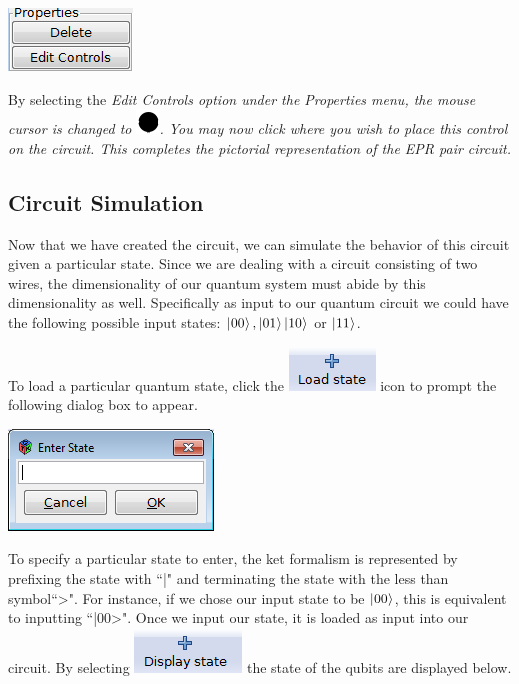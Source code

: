 \documentclass[10pt]{article}
\theoremstyle{definition}
\newcommand{\microspace}{\mspace{0.5mu}}
\def \lket {\left|}
\def \rket {\right\rangle}
\newcommand{\ket}[1]{\lket\microspace #1 \microspace\rket}
\begin{document}
\begin{center}
\includegraphics{Figures/CreateCircuit/Properties.png}
\end{center}

By selecting the \em Edit Controls \em option under the \em Properties \em menu, the mouse cursor is changed to \includegraphics[scale=0.5]{Figures/CreateCircuit/Cursor.png}. You may now click where you wish to place this control on the circuit. This completes the pictorial representation of the EPR pair circuit. 

\subsection{Circuit Simulation}\label{sub:CircuitSimulation}
Now that we have created the circuit, we can simulate the behavior of this circuit given a particular state. Since we are dealing with a circuit consisting of two wires, the dimensionality of our quantum system must abide by this dimensionality as well. Specifically as input to our quantum circuit we could have the following possible input states: $\ket{00}, \ket{01} \ket{10}$ or $\ket{11}$. 

To load a particular quantum state, click the \includegraphics[scale=0.60]{Figures/Navigation/LoadState.png} icon to prompt the following dialog box to appear.

\begin{center}
\includegraphics{Figures/CreateCircuit/LoadState.png}
\end{center}

To specify a particular state to enter, the ket formalism is represented by prefixing the state with ``|"  and terminating the state with the less than symbol``>". For instance, if we chose our input state to be $\ket{00}$, this is equivalent to inputting ``|00>". Once we input our state, it is loaded as input into our circuit. By selecting \includegraphics[scale=0.60]{Figures/Navigation/DisplayState.png} the state of the qubits are displayed below.
\end{document}
